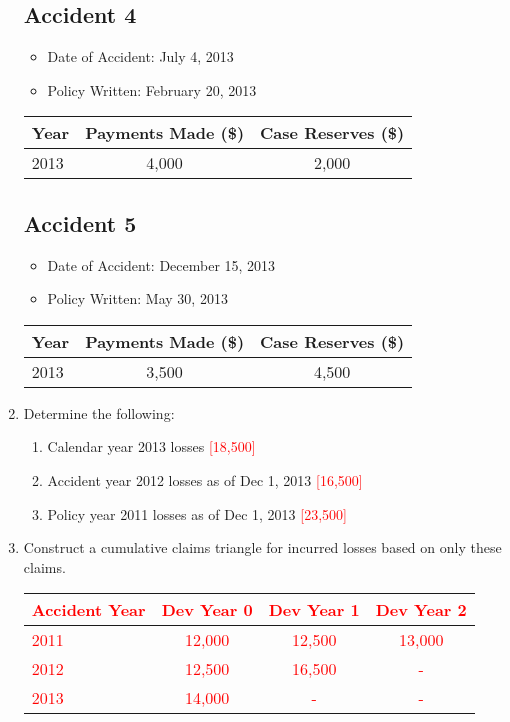 \documentclass{article}
\begin{document}
\begin{enumerate}
\subsection*{Accident 4}
\begin{itemize}
        \item Date of Accident: July 4, 2013
        \item Policy Written: February 20, 2013
\end{itemize}
\begin{tabular}{lcc}
\toprule
Year & Payments Made (\$) & Case Reserves (\$) \\
\midrule
2013 & 4,000 & 2,000 \\
\bottomrule
\end{tabular}

\subsection*{Accident 5}
\begin{itemize}
       \item Date of Accident: December 15, 2013
        \item Policy Written: May 30, 2013
\end{itemize}
\begin{tabular}{lcc}
\toprule
Year & Payments Made (\$) & Case Reserves (\$) \\
\midrule
2013 & 3,500 & 4,500 \\
\bottomrule
\end{tabular}

\item Determine the following:
\begin{enumerate}
\item Calendar year 2013 losses \textcolor{red}{[18,500]}
\item Accident year 2012 losses as of Dec 1, 2013 \textcolor{red}{[16,500]}
\item Policy year 2011 losses as of Dec 1, 2013 \textcolor{red}{[23,500]}
\end{enumerate}

\item Construct a cumulative claims triangle for incurred losses based on only these claims. 

{\color{red}
\begin{table}[h]
\begin{tabular}{@{}lccc@{}}
\toprule
\textcolor{red}{Accident Year} & \textcolor{red}{Dev Year 0} & \textcolor{red}{Dev Year 1} & \textcolor{red}{Dev Year 2} \\ \midrule
\textcolor{red}{2011}          & \textcolor{red}{12,000}     & \textcolor{red}{12,500}     & \textcolor{red}{13,000}     \\
\textcolor{red}{2012}          & \textcolor{red}{12,500}      & \textcolor{red}{16,500}     & \textcolor{red}{-}          \\
\textcolor{red}{2013}          & \textcolor{red}{14,000}     & \textcolor{red}{-}          & \textcolor{red}{-}          \\ \bottomrule
\end{tabular}
\end{table}
}


\end{enumerate}
\end{document}
